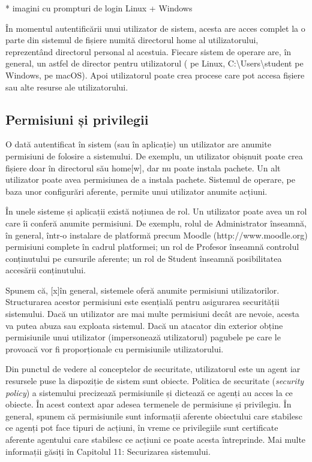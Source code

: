 * imagini cu prompturi de login Linux + Windows

În momentul autentificării unui utilizator de sistem, acesta are acces complet
la o parte din sistemul de fișiere numită directorul home al utilizatorului,
reprezentând directorul personal al acestuia. Fiecare sistem de operare are, în
general, un astfel de director pentru utilizatorul ( pe
Linux, C:\textbackslash{}Users\textbackslash{}student pe Windows,
 pe macOS). Apoi utilizatorul poate crea procese care pot
accesa fișiere sau alte resurse ale utilizatorului.

\subsection{Permisiuni și privilegii}
\label{sec:users-sistem}

O dată autentificat în sistem (sau în aplicație) un utilizator are anumite
permisiuni de folosire a sistemului. De exemplu, un utilizator obișnuit poate
crea fișiere doar în directorul său home[w], dar nu poate instala pachete. Un
alt utilizator poate avea permisiunea de a instala pachete. Sistemul de operare,
pe baza unor configurări aferente, permite unui utilizator anumite acțiuni.

În unele sisteme și aplicații există noțiunea de rol. Un utilizator poate avea
un rol care îi conferă anumite permisiuni. De exemplu, rolul de Administrator
înseamnă, în general, într-o instalare de platformă precum Moodle
(http://www.moodle.org) permisiuni complete în cadrul platformei; un rol de
Profesor înseamnă controlul conținutului pe cursurile aferente; un rol de
Student înseamnă posibilitatea accesării conținutului.

Spunem că, [x]în general, sistemele oferă anumite permisiuni utilizatorilor.
Structurarea acestor permisiuni este esențială pentru asigurarea securității
sistemului. Dacă un utilizator are mai multe permisiuni decât are nevoie, acesta
va putea abuza sau exploata sistemul. Dacă un atacator din exterior obține
permisiunile unui utilizator (impersonează utilizatorul) pagubele pe care le
provoacă vor fi proporționale cu permisiunile utilizatorului.

Din punctul de vedere al conceptelor de securitate, utilizatorul este un agent
iar resursele puse la dispoziție de sistem sunt obiecte. Politica de securitate
(\textit{security policy}) a sistemului precizează permisiunile și dictează ce
agenți au acces la ce obiecte. În acest context apar adesea termenele de
permisiune și privilegiu. În general, spunem că permisiunile sunt informații
aferente obiectului care stabilesc ce agenți pot face tipuri de acțiuni, în
vreme ce privilegiile sunt certificate aferente agentului care stabilesc ce
acțiuni ce poate acesta întreprinde. Mai multe informații găsiți în Capitolul
11: Securizarea sistemului.

